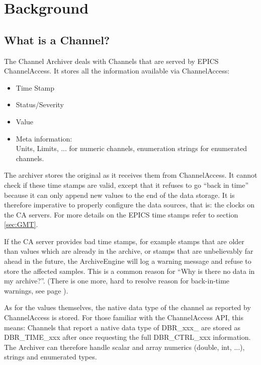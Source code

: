 \chapter{Background} \label{ch:background}

\section{What is a Channel?} %
The Channel Archiver deals with Channels that are served by EPICS
ChannelAccess. It stores all the information available via ChannelAccess:
\begin{itemize}
\item Time Stamp
\item Status/Severity
\item Value
\item Meta information:\\
      Units, Limits, ... for numeric channels,
      enumeration strings for enumerated channels.
\end{itemize}

\noindent The archiver stores the original  as it receives
them from ChannelAccess. It cannot check if these time stamps are valid, except
that it refuses to go ``back in time'' because it can only append new
values to the end of the data storage. It is therefore imperative to
properly configure the data sources, that is: the clocks on the CA
servers. For more details on the EPICS time stamps refer to section
\ref{sec:GMT}.

\label{back:in:time}
\NOTE If the CA server provides bad time stamps, for example stamps
that are older than values which are already in the archive, or stamps
that are unbelievably far ahead in the future, the ArchiveEngine will log
a warning message and refuse to store the affected samples.
This is a common reason for ``Why is there no data in my archive?''.
(There is one more, hard to resolve reason for back-in-time warnings, see
page \pageref{sec:back-in-timefaq}).

As for the values themselves, the native data type of the channel as
reported by ChannelAccess is stored. For those familiar with the
ChannelAccess API, this means:
Channels that report a native data type of DBR\_xxx\_ are stored as
DBR\_TIME\_xxx after once requesting the full DBR\_CTRL\_xxx information.
 The Archiver can therefore handle scalar and array numerics
(double, int, ...), strings and enumerated types. 

